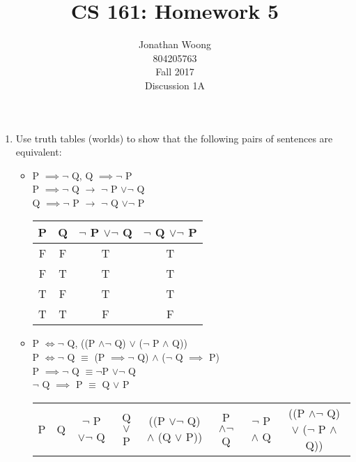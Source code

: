 \documentclass[10.5pt,letterpaper]{article}
\date{\displaydate{date}}
\newcommand\tab[1][0.5cm]{\hspace*{#1}}
\begin{document}
\title{CS 161: Homework 5}
\author{
	Jonathan Woong\\
	804205763\\
	Fall 2017\\
	Discussion 1A}
\maketitle
\pagebreak


\begin{enumerate}[label=\textbf{Problem \arabic*.}]
\item Use truth tables (worlds) to show that the following pairs of sentences are equivalent:
	\begin{itemize}
		\item P $\implies \neg$ Q, Q $\implies \neg$ P \\
			P $\implies \neg$ Q $\rightarrow$ $\neg$ P $\lor \neg$ Q \\
			Q $\implies \neg$ P $\rightarrow$ $\neg$ Q $\lor \neg$ P \\
			\begin{tabular} { |c|c|c|c| }
			\hline
			P & Q & $\neg$ P $\lor \neg$ Q & $\neg$ Q $\lor \neg$ P \\
			\hline
			F & F & \cellcolor{green!25}T & \cellcolor{green!25}T \\
			\hline
			F & T & \cellcolor{green!25}T & \cellcolor{green!25}T \\
			\hline
			T & F & \cellcolor{green!25}T & \cellcolor{green!25}T \\
			\hline
			T & T & \cellcolor{green!25}F & \cellcolor{green!25}F \\
			\hline
			\end{tabular}
		\item P $\Leftrightarrow \neg$ Q, ((P $\land \neg$ Q) $\lor$ ($\neg$ P $\land$ Q)) \\ 
			P $\Leftrightarrow \neg$ Q $\equiv$ (P $\implies \neg$ Q) $\land$ ($\neg$ Q $\implies$ P)\\
				\tab P $\implies \neg$ Q $\equiv \neg$P $\lor \neg$ Q \\
				\tab $\neg$ Q $\implies$ P $\equiv$ Q $\lor$ P \\
			\begin{tabular} { |c|c|c|c|c|c|c|c| }
			\hline
			P & Q & $\neg$ P $\lor \neg$ Q & Q $\lor$ P & ((P $\lor \neg$ Q) $\land$ (Q $\lor$ P)) & P $\land \neg$ Q & $\neg$ P $\land$ Q & ((P $\land \neg$ Q) $\lor$ ($\neg$ P $\land$ Q)) \\

\end{tabular}
\end{itemize}
\end{enumerate}
\end{document}

